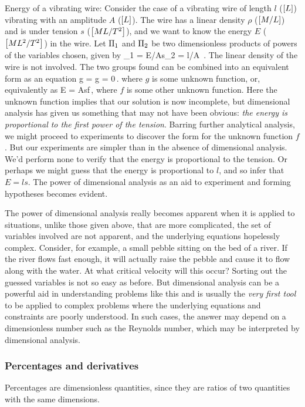 Energy of a vibrating wire: Consider the case of a vibrating wire of length $l$ ($\left[{L}\right]$) vibrating with an amplitude $A$ ($\left[{L}\right]$). The wire has a linear density $\rho$ ($\left[{M/L}\right]$) and is under tension $s$ ($\left[{ML/T^2}\right]$), and we want to know the energy $E$ ($\left[{ML^2/T^2}\right]$) in the wire. Let $\Pi_1$ and $\Pi_2$ be two dimensionless products of powers of the variables chosen, given by
\beq
\kdim_1 = E/As\qquad{}\qquad \kdim_2 = l/A \,.
\eeq
The linear density of the wire is not involved. The two groups found can be combined into an equivalent form as an equation
\beq
g = g = 0\,.
\eeq
where $g$ is some unknown function, or, equivalently as
\beq
E = Asf\,,
\eeq
where $f$ is some other unknown function. Here the unknown function implies that our solution is now incomplete, but dimensional analysis has given us something that may not have been obvious: \emph{the energy is proportional to the first power of the tension}. Barring further analytical analysis, we might proceed to experiments to discover the form for the unknown function $f$. But our experiments are simpler than in the absence of dimensional analysis. We'd perform none to verify that the energy is proportional to the tension. Or perhaps we might guess that the energy is proportional to $l$, and so infer that $E = ls$. The power of dimensional analysis as an aid to experiment and forming hypotheses becomes evident.

The power of dimensional analysis really becomes apparent when it is applied to situations, unlike those given above, that are more complicated, the set of variables involved are not apparent, and the underlying equations hopelessly complex. Consider, for example, a small pebble sitting on the bed of a river. If the river flows fast enough, it will actually raise the pebble and cause it to flow along with the water. At what critical velocity will this occur? Sorting out the guessed variables is not so easy as before. But dimensional analysis can be a powerful aid in understanding problems like this and is usually the \emph{very first tool} to be applied to complex problems where the underlying equations and constraints are poorly understood. In such cases, the answer may depend on a dimensionless number such as the Reynolds number, which may be interpreted by dimensional analysis.


\subsubsection{Percentages and derivatives}
Percentages are dimensionless quantities, since they are ratios of two quantities with the same dimensions.

